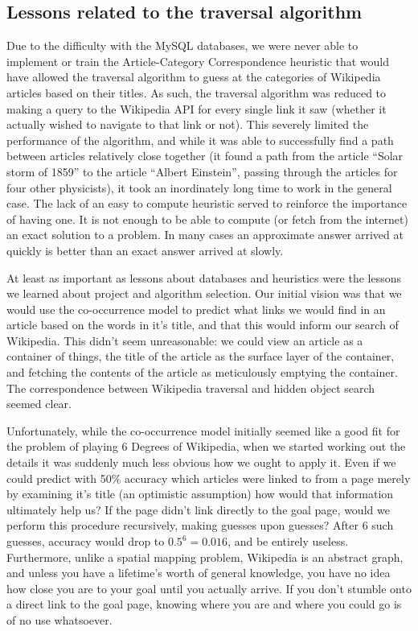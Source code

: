 \documentclass{article}
\begin{document}
\subsection{Lessons related to the traversal algorithm}
Due to the difficulty with the MySQL databases, we were never able to implement or train
the Article-Category Correspondence heuristic that would have allowed the traversal algorithm
to guess at the categories of Wikipedia articles based on their titles.
As such, the traversal algorithm was reduced to making a query to the Wikipedia API
for every single link it saw (whether it actually wished to navigate to that link or not).
This severely limited the performance of the algorithm, and while it was able to successfully
find a path between articles relatively close together
(it found a path from the article ``Solar storm of 1859'' to the article ``Albert Einstein'',
passing through the articles for four other physicists),
it took an inordinately long time to work in the general case.
The lack of an easy to compute heuristic served to reinforce the importance of having one.
It is not enough to be able to compute (or fetch from the internet) an exact solution to a problem.
In many cases an approximate answer arrived at quickly is better than an exact answer arrived at slowly.

At least as important as lessons about databases and heuristics were the lessons we learned about project and algorithm selection.
Our initial vision was that we would use the co-occurrence model to predict
what links we would find in an article based on the words in it's title,
and that this would inform our search of Wikipedia.
This didn't seem unreasonable: we could view an article as a container of things,
the title of the article as the surface layer of the container,
and fetching the contents of the article as meticulously emptying the container.
The correspondence between Wikipedia traversal and hidden object search seemed clear.

Unfortunately, while the co-occurrence model initially seemed like a good fit for the problem of playing 6 Degrees of Wikipedia,
when we started working out the details it was suddenly much less obvious how we ought to apply it.
Even if we could predict with 50\% accuracy which articles were linked to from a page merely by examining it's title
(an optimistic assumption) how would that information ultimately help us?
If the page didn't link directly to the goal page, would we perform this procedure recursively, making guesses upon guesses?
After 6 such guesses, accuracy would drop to $0.5^6 = 0.016$, and be entirely useless.
Furthermore, unlike a spatial mapping problem, Wikipedia is an abstract graph,
and unless you have a lifetime's worth of general knowledge, you have no idea how close you are to your goal until you actually arrive.
If you don't stumble onto a direct link to the goal page, knowing where you are and where you could go is of no use whatsoever.
\end{document}

